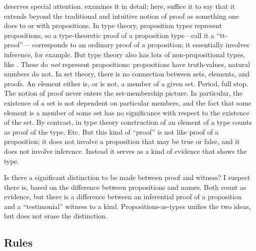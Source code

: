  deserves special
attention.   examines it in detail; here, suffice it
to say that it extends beyond the traditional and intuitive notion of
proof as something one does to or with propositions.  In type theory,
proposition types represent propositions, so a type-theoretic proof
of a proposition type---call it a ``tt-proof''--- corresponds to an
ordinary proof of a proposition; it essentially involves inference,
for example.  But type theory also has lots of non-propositional
types, like \N.  These do \textit{not} represent propositions:
propositions have truth-values, natural numbers do not.  In set
theory, there is no connection between sets, elements, and proofs.  An
element either is, or is not, a member of a given set.  Period, full
stop.  The notion of proof never enters the set-membership
picture.
In particular, the existence of a set is not dependent on particular
members, and the fact that some element is a member of some set has no
significance with respect to the existence of the set.  By contrast,
in type theory construction of an element of a type counts as proof of
the type.  Etc.  But this kind of
``proof'' is not like proof of a proposition; it does not involve a
proposition that may be true or false, and it does not involve
inference.  Instead it serves as a kind of evidence that shows the
type.

\begin{ednote}
  Is there a significant distinction to be made between proof and
  witness?  I suspect there is, based on the difference between
  propositions and names.  Both count as evidence, but there is a
  difference between an inferential proof of a proposition and a
  ``testimonial'' witness to a kind.  Propositions-as-types unifies
  the two ideas, but does not erase the distinction.
\end{ednote}

\subsection{\HoTT{} Rules}
\label{subs:hottrules}

